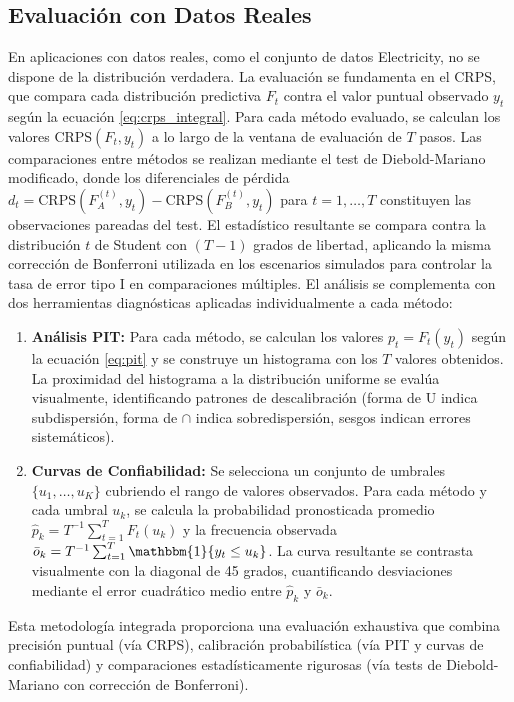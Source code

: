 \subsection{Evaluación con Datos Reales}

En aplicaciones con datos reales, como el conjunto de datos Electricity, no se dispone de la distribución verdadera. La evaluación se fundamenta en el CRPS, que compara cada distribución predictiva $F_t$ contra el valor puntual observado $y_t$ según la ecuación \eqref{eq:crps_integral}.
Para cada método evaluado, se calculan los valores $\text{CRPS}(F_t, y_t)$ a lo largo de la ventana de evaluación de $T$ pasos. Las comparaciones entre métodos se realizan mediante el test de Diebold-Mariano modificado, donde los diferenciales de pérdida $d_t = \text{CRPS}(F_A^{(t)}, y_t) - \text{CRPS}(F_B^{(t)}, y_t)$ para $t = 1, \ldots, T$ constituyen las observaciones pareadas del test. El estadístico resultante se compara contra la distribución $t$ de Student con $(T-1)$ grados de libertad, aplicando la misma corrección de Bonferroni utilizada en los escenarios simulados para controlar la tasa de error tipo I en comparaciones múltiples.
El análisis se complementa con dos herramientas diagnósticas aplicadas individualmente a cada método:

\begin{enumerate}
\item \textbf{Análisis PIT:} Para cada método, se calculan los valores $p_t = F_t(y_t)$ según la ecuación \eqref{eq:pit} y se construye un histograma con los $T$ valores obtenidos. La proximidad del histograma a la distribución uniforme se evalúa visualmente, identificando patrones de descalibración (forma de U indica subdispersión, forma de $\cap$ indica sobredispersión, sesgos indican errores sistemáticos).

\item \textbf{Curvas de Confiabilidad:} Se selecciona un conjunto de umbrales $\{u_1, \ldots, u_K\}$ cubriendo el rango de valores observados. Para cada método y cada umbral $u_k$, se calcula la probabilidad pronosticada promedio $\hat{p}_k = T^{-1}\sum_{t=1}^T F_t(u_k)$ y la frecuencia observada $\bar{o}_k = T^{-1}\sum_{t=1}^T \mathbbm{1}\{y_t \leq u_k\}$. La curva resultante se contrasta visualmente con la diagonal de 45 grados, cuantificando desviaciones mediante el error cuadrático medio entre $\hat{p}_k$ y $\bar{o}_k$.
\end{enumerate}

Esta metodología integrada proporciona una evaluación exhaustiva que combina precisión puntual (vía CRPS), calibración probabilística (vía PIT y curvas de confiabilidad) y comparaciones estadísticamente rigurosas (vía tests de Diebold-Mariano con corrección de Bonferroni).





